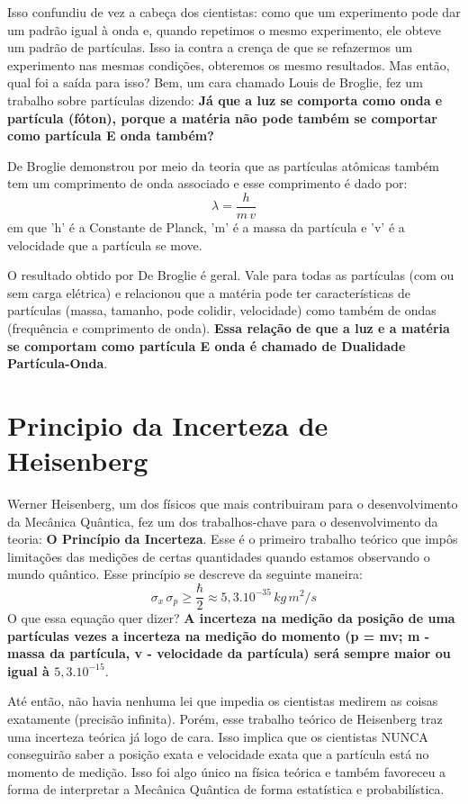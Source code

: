 \documentclass[12pt]{extarticle}
\newcommand{\<}{\langle}
\renewcommand{\>}{\rangle}
\theoremstyle{definition}
\begin{document}
Isso confundiu de vez a cabeça dos cientistas: como que um experimento pode dar um padrão igual à onda e, quando repetimos o mesmo experimento, ele obteve um padrão de partículas. Isso ia contra a crença de que se refazermos um experimento nas mesmas condições, obteremos os mesmo resultados. Mas então, qual foi a saída para isso? Bem, um cara chamado Louis de Broglie, fez um trabalho sobre partículas dizendo: \textbf{Já que a luz se comporta como onda e partícula (fóton), porque a matéria não pode também se comportar como partícula E onda também?}

De Broglie demonstrou por meio da teoria que as partículas atômicas também tem um comprimento de onda associado e esse comprimento é dado por:
\begin{equation}
    \lambda = \frac{h}{m\,v}
\end{equation}
\noindent em que 'h' é a Constante de Planck, 'm' é a massa da partícula e 'v' é a velocidade que a partícula se move.

O resultado obtido por De Broglie é geral. Vale para todas as partículas (com ou sem carga elétrica) e relacionou que a matéria pode ter características de partículas (massa, tamanho, pode colidir, velocidade) como também de ondas (frequência e comprimento de onda). \textbf{Essa relação de que a luz e a matéria se comportam como partícula E onda é chamado de Dualidade Partícula-Onda}.

\section{Principio da Incerteza de Heisenberg}

Werner Heisenberg, um dos físicos que mais contribuiram para o desenvolvimento da Mecânica Quântica, fez um dos trabalhos-chave para o desenvolvimento da teoria: \textbf{O Princípio da Incerteza}. Esse é o primeiro trabalho teórico que impôs limitações das medições de certas quantidades quando estamos observando o mundo quântico. Esse princípio se descreve da seguinte maneira:
\begin{equation}
    \sigma_x\,\sigma_p \geq \frac{\hbar}{2} \approx 5,3.10^{-35}\,kg\,m^2/s
\end{equation}
O que essa equação quer dizer? \textbf{A incerteza na medição da posição de uma partículas vezes a incerteza na medição do momento (p = mv; m - massa da partícula, v - velocidade da partícula) será sempre maior ou igual à $5,3.10^{-15}$}.

Até então, não havia nenhuma lei que impedia os cientistas medirem as coisas exatamente (precisão infinita). Porém, esse trabalho teórico de Heisenberg traz uma incerteza teórica já logo de cara. Isso implica que os cientistas NUNCA conseguirão saber a posição exata e velocidade exata que a partícula está no momento de medição. Isso foi algo único na física teórica e também favoreceu a forma de interpretar a Mecânica Quântica de forma estatística e probabilística.
\end{document}
